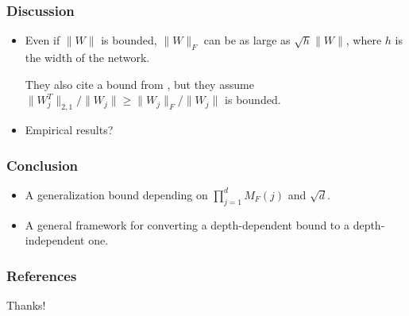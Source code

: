 \documentclass{beamer}
\begin{document}
\begin{frame}
\frametitle{Discussion}
\begin{itemize}
    \item Even if $\|W\|$ is bounded, $\|W\|_F$ can be as large as $\sqrt{h}\|W\|$, where $h$ is the width of the network.

    They also cite a bound from \cite{BFT17}, but they assume $\|W_j^T\|_{2,1}/\|W_j\|\ge \|W_j\|_F/\|W_j\|$ is bounded.
    \item Empirical results?
\end{itemize}
\end{frame}

\begin{frame}
\frametitle{Conclusion}
\begin{itemize}
    \item A generalization bound depending on $\prod_{j=1}^{d}M_F(j)$ and $\sqrt{d}$.
    \item A general framework for converting a depth-dependent bound to a depth-independent one.
\end{itemize}
\end{frame}


\begin{frame}
\frametitle{References}
\printbibliography
\end{frame}


\begin{frame}
\Large{\centerline{Thanks!}}
\end{frame}

\end{document}
